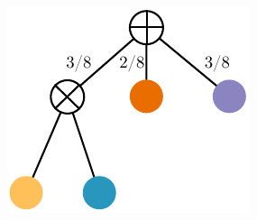 \documentclass[10pt, t, xcolor={usenames,dvipsnames,svgnames}, compress]{beamer}
\begin{document}
\begin{frame}
{{\begin{minipage}[t]{0.3\linewidth}
        \begin{center}
          \includegraphics[width=0.83\linewidth]{figures/learnspn-2-w}
        \end{center}
      \end{minipage}}}\hspace{4pt}
\end{frame}
\end{document}
